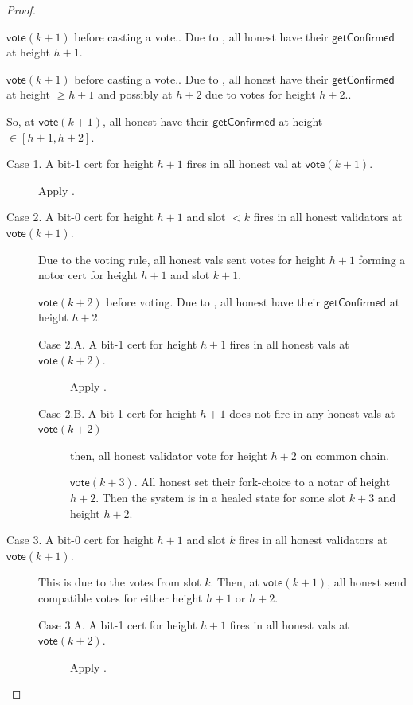 \documentclass{article}
\newcommand{\vote}{\mathsf{vote}}
\newcommand{\getConfirmed}{\textsf{getConfirmed}\xspace}
\theoremstyle{plain}
\theoremstyle{definition}
\theoremstyle{remark}
\begin{document}
\begin{proof}
{\begin{description}
  $\vote(k+1)$ before casting a vote..
  Due to , all honest have their $\getConfirmed$ at height $h+1$.

  \item[Case 2. Some honest for height $h+1$ at $\vote(k)$.]
  
  $\vote(k+1)$ before casting a vote..
  Due to , all honest have their $\getConfirmed$ at height $\geq h+1$ and possibly at $h+2$ due to votes for height $h+2$..
\end{description}

So, at $\vote(k+1)$, all honest have their $\getConfirmed$ at height $\in [h+1,h+2]$.

\begin{description}
  \item[Case 1. A bit-1 cert for height $h+1$ fires in all honest val at $\vote(k+1)$.]
  Apply .
  
  \item[Case 2. A bit-0 cert for height $h+1$ and slot $<k$ fires in all honest validators at $\vote(k+1)$.]
  Due to the voting rule, all honest vals sent votes for height $h+1$ forming a notor cert for height $h+1$ and slot $k+1$.

  $\vote(k+2)$ before voting. Due to , all honest have their $\getConfirmed$ at height $h+2$.

  \begin{description}
    \item[Case 2.A. A bit-1 cert for height $h+1$ fires in all honest vals at $\vote(k+2)$.] 
    Apply .
    \item[Case 2.B. A bit-1 cert for height $h+1$ does not fire in any honest vals at $\vote(k+2)$] 
    then, all honest validator vote for height $h+2$ on common chain.

    $\vote(k+3)$. All honest set their fork-choice to a notar of height $h+2$.
    Then the system is in a healed state for some slot $k+3$ and height $h+2$.
  \end{description}


  \item[Case 3. A bit-0 cert for height $h+1$ and slot $k$ fires in all honest validators at $\vote(k+1)$.]
  This is due to the votes from slot $k$.
  Then, at $\vote(k+1)$, all honest send compatible votes for either height $h+1$ or $h+2$.
  \begin{description}
    \item[Case 3.A. A bit-1 cert for height $h+1$ fires in all honest vals at $\vote(k+2)$.]
    Apply .


\end{description}
\end{description}}
\end{proof}
\end{document}

